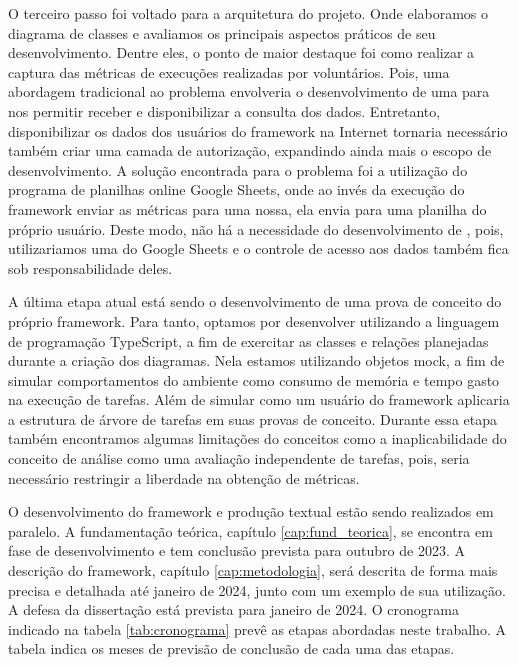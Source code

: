 \documentclass[12pt]{tcc}
\begin{document}
O terceiro passo foi voltado para a arquitetura do projeto.
Onde elaboramos o diagrama de classes e avaliamos os principais aspectos práticos de seu desenvolvimento.
Dentre eles, o ponto de maior destaque foi como realizar a captura das métricas de execuções realizadas por voluntários.
Pois, uma abordagem tradicional ao problema envolveria o desenvolvimento de uma  para nos permitir receber e disponibilizar a consulta dos dados.
Entretanto, disponibilizar os dados dos usuários do framework na Internet tornaria necessário também criar uma camada de autorização, expandindo ainda mais o escopo de desenvolvimento.
A solução encontrada para o problema foi a utilização do programa de planilhas online Google Sheets, onde ao invés da execução do framework enviar as métricas para uma  nossa, ela envia para uma planilha do próprio usuário.
Deste modo, não há a necessidade do desenvolvimento de , pois, utilizariamos uma do Google Sheets e o controle de acesso aos dados também fica sob responsabilidade deles.

A última etapa atual está sendo o desenvolvimento de uma prova de conceito do próprio framework.
Para tanto, optamos por desenvolver utilizando a linguagem de programação TypeScript, a fim de exercitar as classes e relações planejadas durante a criação dos diagramas.
Nela estamos utilizando objetos mock, a fim de simular comportamentos do ambiente como consumo de memória e tempo gasto na execução de tarefas.
Além de simular como um usuário do framework aplicaria a estrutura de árvore de tarefas em suas provas de conceito.
Durante essa etapa também encontramos algumas limitações do conceitos como a inaplicabilidade do conceito de análise como uma avaliação independente de tarefas, pois, seria necessário restringir a liberdade na obtenção de métricas.

O desenvolvimento do framework e produção textual estão sendo realizados em paralelo.
A fundamentação teórica, capítulo \ref{cap:fund_teorica}, se encontra em fase de desenvolvimento e tem conclusão prevista para outubro de 2023.
A descrição do framework, capítulo \ref{cap:metodologia}, será descrita de forma mais precisa e detalhada até janeiro de 2024, junto com um exemplo de sua utilização.
A defesa da dissertação está prevista para janeiro de 2024. O cronograma indicado na tabela \ref{tab:cronograma} prevê as etapas abordadas neste trabalho.
A tabela indica os meses de previsão de conclusão de cada uma das etapas.
\end{document}
